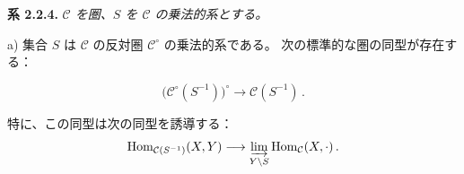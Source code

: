 \smallskip
\noindent\textbf{系 2.2.4.}\quad
\begingroup\itshape
$\mathcal C$ を圏、$S$ を $\mathcal C$ の乗法的系とする。

\par\noindent a) 集合 $S$ は $\mathcal C$ の反対圏
$\mathcal C^\circ$ の乗法的系である。
%
次の標準的な圏の同型が存在する：

\[
  \bigl(\mathcal C^\circ(S^{-1})\bigr)^\circ
  \longrightarrow \mathcal C(S^{-1})\,.
\]

\noindent 特に、この同型は次の同型を誘導する：
\[
  \operatorname{Hom}_{\mathcal C(S^{-1})}(X,Y)
  \longrightarrow
  \varinjlim_{Y\backslash S}\operatorname{Hom}_{\mathcal C}(X,\mathord\cdot)\,.
\]
\endgroup

\endgroup
